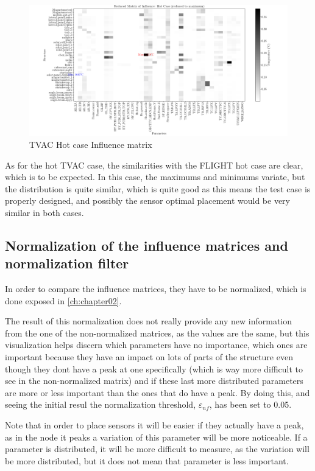 \begin{figure}[H]
    \centering
    \includegraphics[width = \linewidth]{Figures/UPMSat3/TVAC/Nuevas/infmatHC.png}
    \caption{TVAC Hot case Influence matrix}
    \label{fig:THC-infmat}
\end{figure}

As for the hot TVAC case, the similarities with the FLIGHT hot case are clear, which is to be expected. In this case, the maximums and minimums variate, but the distribution is quite similar, which is quite good as this means the test case is properly designed, and possibly the sensor optimal placement would be very similar in both cases. 


\subsection{Normalization of the influence matrices and normalization filter}
In order to compare the influence matrices, they have to be normalized, which is done exposed in \autoref{ch:chapter02}.

The result of this normalization does not really provide any new information from the one of the non-normalized matrices, as the values are the same, but this visualization helps discern which parameters have no importance, which ones are important because they have an impact on lots of parts of the structure even though they dont have a peak at one specifically (which is way more difficult to see in the non-normalized matrix) and if these last more distributed parameters are more or less important than the ones that do have a peak. By doing this, and seeing the initial resul the normalization threshold, $\varepsilon_{nf}$, has been set to 0.05.

Note that in order to place sensors it will be easier if they actually have a peak, as in the node it peaks a variation of this parameter will be more noticeable. If a parameter is distributed, it will be more difficult to measure, as the variation will be more distributed, but it does not mean that parameter is less important. 

